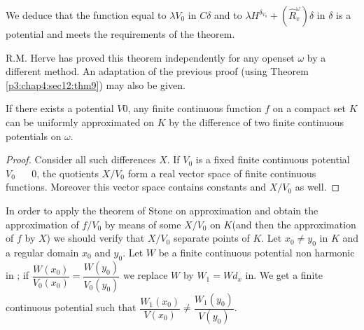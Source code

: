 We deduce that the function equal to $\lambda V_0$ in $C \delta$ and
to $\lambda H^{\delta_{V_0}} + (\hat{R}^\omega_v) \delta$ in $\delta$
is a potential and meets the requirements of the theorem. 

\begin{extension}
  R.M. Herve has proved this theorem independently for any open\pageoriginale set
  $\omega$ by
  a different method. An adaptation of the previous proof (using
  Theorem \ref{p3:chap4:sec12:thm9}) may also be given. 
\end{extension}

\begin{thm}\label{p4:chap4:sec21:thm15} %
If there exists a potential
  $V 0$, any finite continuous function $f$ on a compact set $K$ can be
  uniformly approximated on $K$ by the difference of two finite
  continuous potentials on $\omega$.  
\end{thm}

\begin{proof}
  Consider all such differences $X$. If $V_0$ is a fixed finite
  continuous potential $V_0$ ~~ 0, the quotients $X/V_0$ form a real
  vector space of finite continuous functions. Moreover this vector
  space contains constants and $X/ V_0$ as well.	 
\end{proof}

In order to apply the theorem of Stone on approximation and obtain the
approximation of $f /V_0$ by means of some $X/V_0$ on $K$(and then the
approximation of $f$ by $X$) we should verify that $X/{V_0}$ separate
points of $K$. Let $x_0 \neq y_0$ in $K$ and a regular domain $x_0 $
and $y_0$. Let $W$ be a finite continuous potential non harmonic in ;
if $\dfrac{W(x_0)}{V_0(x_0)} = \dfrac{W(y_0)}{V_0(y_0)}$ we replace
$W$ by $W_1 = Wd _x $ in. We get a finite continuous potential such
that $\dfrac{W_1(x_0)}{V(x_0)}\neq \dfrac{W_1(y_0)}{V(y_0)}$. 

